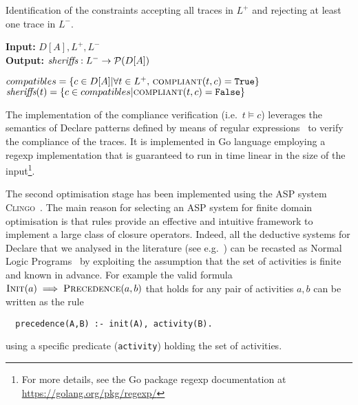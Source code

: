 \makeatletter
\algrenewcommand\ALG@beginalgorithmic{\footnotesize}
\makeatother

\begin{algorithm}
    \caption{Identification of the constraints accepting all traces in $L^+$ and rejecting at least one trace in $L^-$.}
    \label{algcand}
    \textbf{Input:}  $D[A], L^+, L^-$\\
    \textbf{Output:} $\textit{sheriffs} : L^- \rightarrow \mathcal{P}({D[A]})$
    	\begin{algorithmic}[1] 
   	\State ${compatibles}= \{c \in D[A]| \forall t \in L^+,\, \Call{compliant}{t,c} = \texttt{True}\}$ 
	\label{algcand:candidates}
		\State $\textit{\sheriff}(t) = \{c \in {compatibles} | \Call{compliant}{t,c} = \texttt{False}\}$\label{algcand:choices}
	\EndFor
	\State \Return \textit{\sheriff}
    \EndProcedure
    \end{algorithmic}
\end{algorithm}

\makeatletter
\algrenewcommand\ALG@beginalgorithmic{\normalsize}
\makeatother

The implementation of the compliance verification  (i.e.\ $t\models c$) leverages the semantics of Declare patterns defined by means of regular expressions \cite{2017-DiCiccio}%
~to verify the compliance of the traces. It is implemented in Go language employing a regexp implementation that is guaranteed to run in time linear in the size of the input\footnote{For more details, see the Go package regexp documentation at \url{https://golang.org/pkg/regexp/}}.
\lstset{language=Prolog}

The second optimisation stage has been implemented using the \ac{ASP} system \textsc{Clingo}~\cite{DBLP:journals/corr/GebserKKS14}. The main reason for selecting an \ac{ASP} system for finite domain optimisation is that rules provide an effective and intuitive framework to implement a large class of closure operators. Indeed, all the deductive systems for Declare that we analysed in the literature (see e.g.~\cite{2016-Bernardi,2017-DiCiccio}) can be recasted as Normal Logic Programs~\cite{2008-Lifschitz} by exploiting the assumption that the set of activities is finite and known in advance.
%
For example the valid formula $\textsc{Init}(a)\implies\textsc{Precedence}(a,b)$ that holds for any pair of activities $a, b$ can be written as the rule
\begin{lstlisting}
  precedence(A,B) :- init(A), activity(B).
\end{lstlisting}
using a specific predicate (\lstinline{activity}) holding the set of activities.

